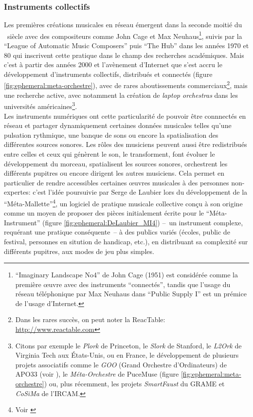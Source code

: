\subsubsection{Instruments collectifs}
\label{sec:ephemeral:origins:collectiveDMIs}

\noindent Les premières créations musicales en réseau émergent dans la seconde moitié du ~siècle avec des compositeurs comme John Cage et Max Neuhaus\footnote{``Imaginary Landscape No4'' de John Cage (1951) est considérée comme la première œuvre avec des instruments ``connectés'', tandis que l'usage du réseau téléphonique par Max Neuhaus dans ``Public Supply I'' est un prémice de l'usage d'Internet.}, suivis par la ``League of Automatic Music Composers'' puis ``The Hub'' dans les années 1970 et 80 qui inscrivent cette pratique dans le champ des recherches académiques. Mais c'est à partir des années 2000 et l'avènement d'Internet que s'est accru le développement d'instruments collectifs, distribués et connectés (figure \ref{fig:ephemeral:meta-orchestre}), avec de rares aboutissements commerciaux\footnote{Dans les rares succès, on peut noter la ReacTable: \url{http://www.reactable.com}}, mais une recherche active, avec notamment la création de \textit{laptop orchestras} dans les universités américaines\footnote{Citons par exemple le \textit{Plork} de Princeton, le \textit{Slork} de Stanford, le \textit{L2Ork} de Virginia Tech aux États-Unis, ou en France, le développement de plusieurs projets associatifs comme le \textit{GOO} (Grand Orchestre d'Ordinateurs) de \gls{APO33} (voir \cite{apo33_lorchestre_2003}), le \textit{Méta-Orchestre} de PuceMuse (figure \ref{fig:ephemeral:meta-orchestre}) ou, plus récemment, les projets \textit{SmartFaust} du \gls{GRAME} et \textit{CoSiMa} de l'\gls{IRCAM}.}.\\
\indent Les instruments numériques ont cette particularité de pouvoir être connnectés en réseau et partager dynamiquement certaines données musicales telles qu'une pulsation rythmique, une banque de sons ou encore la spatialisation des différentes sources sonores. Les rôles des musiciens peuvent aussi être redistribués entre celles et ceux qui génèrent le son, le transforment, font évoluer le développement du morceau, spatialisent les sources sonores, orchestrent les différents pupitres ou encore dirigent les autres musiciens. Cela permet en particulier de rendre accessibles certaines œuvres musicales à des personnes non-expertes: c'est l'idée poursuivie par Serge de Laubier lors du développement de la ``Méta-Mallette''\footnote{Voir \cite{de_laubier_puce_2008, cance_questionner_2009}}, un logiciel de pratique musicale collective conçu à son origine comme un moyen de proposer des pièces initialement écrite pour le ``Méta-Instrument'' (figure \ref{fig:ephemeral:DeLaubier_MI4}) --~un instrument complexe, requérant une pratique conséquente~-- à des publics variés (écoles, public de festival, personnes en sitution de handicap, etc.), en distribuant sa complexité sur différents pupitres, aux modes de jeu plus simples.\\
